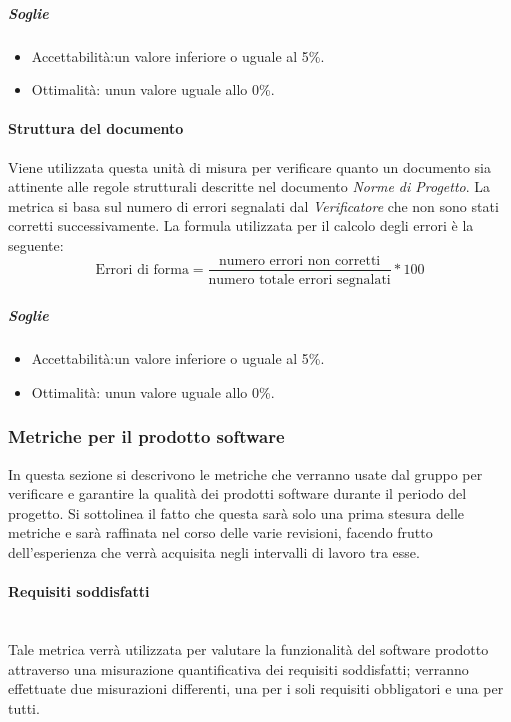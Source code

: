 \subparagraph{Soglie}
\begin{itemize}
\item Accettabilità:un valore inferiore o uguale al 5\%.
\item Ottimalità: unun valore uguale allo 0\%.
\end{itemize}

\paragraph{Struttura del documento}
Viene utilizzata questa unità di misura per verificare quanto un documento sia attinente alle regole strutturali descritte nel documento \textit{Norme di Progetto}.
La metrica si basa sul numero di errori segnalati dal \textit{Verificatore} che non sono stati corretti successivamente.
\newline La formula utilizzata per il calcolo degli errori è la seguente:
\begin{displaymath}
\mbox{Errori di forma}=\frac{\mbox{numero errori non corretti}}{\mbox{numero totale errori segnalati}}*100
\end{displaymath}

\subparagraph{Soglie}
\begin{itemize}
\item Accettabilità:un valore inferiore o uguale al 5\%.
\item Ottimalità: unun valore uguale allo 0\%.
\end{itemize}

\subsubsection{Metriche per il prodotto software}
\label{AppB:metricheSoft}
In questa sezione si descrivono le metriche che verranno usate dal gruppo per verificare e garantire la qualità dei prodotti software durante il periodo del progetto. Si sottolinea il fatto che questa sarà solo una prima stesura delle metriche e sarà raffinata nel corso delle varie revisioni, facendo frutto dell'esperienza che verrà acquisita negli intervalli di lavoro tra esse.

\paragraph{Requisiti soddisfatti}
	~\\Tale metrica verrà utilizzata per valutare la funzionalità del software prodotto attraverso una misurazione quantificativa dei requisiti soddisfatti; verranno effettuate due misurazioni differenti, una per i soli requisiti obbligatori e una per tutti.

